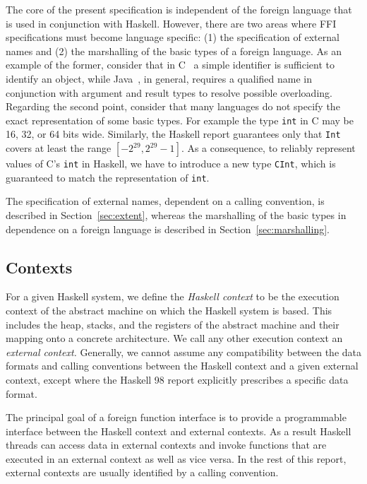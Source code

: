 \documentclass[a4paper,twoside]{article}
\newcommand{\code}[1]{\texttt{#1}}      %
\begin{document}
The core of the present specification is independent of the foreign language
that is used in conjunction with Haskell.  However, there are two areas where
FFI specifications must become language specific: (1) the specification of
external names and (2) the marshalling of the basic types of a foreign
language.  As an example of the former, consider that in C~\cite{C} a simple
identifier is sufficient to identify an object, while
Java~\cite{gosling-etal:Java}, in general, requires a qualified name in
conjunction with argument and result types to resolve possible overloading.
Regarding the second point, consider that many languages do not specify the
exact representation of some basic types.  For example the type \code{int} in
C may be 16, 32, or 64 bits wide.  Similarly, the Haskell report guarantees
only that \code{Int} covers at least the range \([-2^{29}, 2^{29} - 1]\).  As
a consequence, to reliably represent values of C's \code{int} in Haskell, we
have to introduce a new type \code{CInt}, which is guaranteed to match the
representation of \code{int}.

The specification of external names, dependent on a calling convention, is
described in Section~\ref{sec:extent}, whereas the marshalling of the basic
types in dependence on a foreign language is described in
Section~\ref{sec:marshalling}.

\subsection{Contexts}

For a given Haskell system, we define the \emph{Haskell context} to be the
execution context of the abstract machine on which the Haskell system is
based.  This includes the heap, stacks, and the registers of the abstract
machine and their mapping onto a concrete architecture.  We call any other
execution context an \emph{external context.}  Generally, we cannot assume any
compatibility between the data formats and calling conventions between the
Haskell context and a given external context, except where the Haskell 98
report explicitly prescribes a specific data format.

The principal goal of a foreign function interface is to provide a
programmable interface between the Haskell context and external contexts.  As
a result Haskell threads can access data in external contexts and invoke
functions that are executed in an external context as well as vice versa.  In
the rest of this report, external contexts are usually identified by a calling
convention. 
\end{document}
